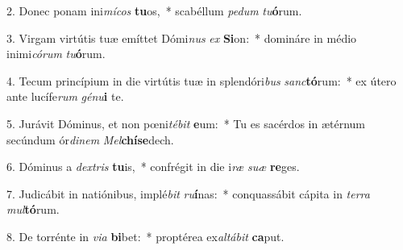 2. Donec ponam ini\textit{mí}\textit{cos} \textbf{tu}os,~*  scabéllum \textit{pe}\textit{dum} \textit{tu}\textbf{ó}rum.\

3. Virgam virtútis tuæ emíttet Dómi\textit{nus} \textit{ex} \textbf{Si}on:~*  domináre in médio inimi\textit{có}\textit{rum} \textit{tu}\textbf{ó}rum.\

4. Tecum princípium in die virtútis tuæ in splendóri\textit{bus} \textit{sanc}\textbf{tó}rum:~*  ex útero ante lucífe\textit{rum} \textit{gé}\textit{nu}\textbf{i} te.\

5. Jurávit Dóminus, et non pœni\textit{té}\textit{bit} \textbf{e}um:~*  Tu es sacérdos in ætérnum secúndum ór\textit{di}\textit{nem} \textit{Mel}\textbf{chí}\textbf{se}dech.\

6. Dóminus a \textit{dex}\textit{tris} \textbf{tu}is,~*  confrégit in die i\textit{ræ} \textit{su}\textit{æ} \textbf{re}ges.\

7. Judicábit in natiónibus, implé\textit{bit} \textit{ru}\textbf{í}nas:~*  conquassábit cápita in \textit{ter}\textit{ra} \textit{mul}\textbf{tó}rum.\

8. De torrénte in \textit{vi}\textit{a} \textbf{bi}bet:~*  proptérea ex\textit{al}\textit{tá}\textit{bit} \textbf{ca}put.\

